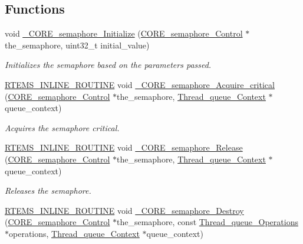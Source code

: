 \subsection*{Functions}
\begin{DoxyCompactItemize}
\item 
void \mbox{\hyperlink{group__RTEMSScoreSemaphore_gac27cc1e0e9ee28a645e9bdbd0f14fb1a}{\+\_\+\+C\+O\+R\+E\+\_\+semaphore\+\_\+\+Initialize}} (\mbox{\hyperlink{structCORE__semaphore__Control}{C\+O\+R\+E\+\_\+semaphore\+\_\+\+Control}} $\ast$the\+\_\+semaphore, uint32\+\_\+t initial\+\_\+value)
\begin{DoxyCompactList}\small\item\em Initializes the semaphore based on the parameters passed. \end{DoxyCompactList}\item 
\mbox{\hyperlink{group__RTEMSScoreBaseDefs_gac216239df231d5dbd15e3520b0b9313f}{R\+T\+E\+M\+S\+\_\+\+I\+N\+L\+I\+N\+E\+\_\+\+R\+O\+U\+T\+I\+NE}} void \mbox{\hyperlink{group__RTEMSScoreSemaphore_gaac9e977e243913aae8631eba19979bdf}{\+\_\+\+C\+O\+R\+E\+\_\+semaphore\+\_\+\+Acquire\+\_\+critical}} (\mbox{\hyperlink{structCORE__semaphore__Control}{C\+O\+R\+E\+\_\+semaphore\+\_\+\+Control}} $\ast$the\+\_\+semaphore, \mbox{\hyperlink{structThread__queue__Context}{Thread\+\_\+queue\+\_\+\+Context}} $\ast$queue\+\_\+context)
\begin{DoxyCompactList}\small\item\em Acquires the semaphore critical. \end{DoxyCompactList}\item 
\mbox{\hyperlink{group__RTEMSScoreBaseDefs_gac216239df231d5dbd15e3520b0b9313f}{R\+T\+E\+M\+S\+\_\+\+I\+N\+L\+I\+N\+E\+\_\+\+R\+O\+U\+T\+I\+NE}} void \mbox{\hyperlink{group__RTEMSScoreSemaphore_ga1006d856222570dda9c8155c7b5bcacd}{\+\_\+\+C\+O\+R\+E\+\_\+semaphore\+\_\+\+Release}} (\mbox{\hyperlink{structCORE__semaphore__Control}{C\+O\+R\+E\+\_\+semaphore\+\_\+\+Control}} $\ast$the\+\_\+semaphore, \mbox{\hyperlink{structThread__queue__Context}{Thread\+\_\+queue\+\_\+\+Context}} $\ast$queue\+\_\+context)
\begin{DoxyCompactList}\small\item\em Releases the semaphore. \end{DoxyCompactList}\item 
\mbox{\hyperlink{group__RTEMSScoreBaseDefs_gac216239df231d5dbd15e3520b0b9313f}{R\+T\+E\+M\+S\+\_\+\+I\+N\+L\+I\+N\+E\+\_\+\+R\+O\+U\+T\+I\+NE}} void \mbox{\hyperlink{group__RTEMSScoreSemaphore_ga8cb7a05fae43763cd179a2c1dcdb873c}{\+\_\+\+C\+O\+R\+E\+\_\+semaphore\+\_\+\+Destroy}} (\mbox{\hyperlink{structCORE__semaphore__Control}{C\+O\+R\+E\+\_\+semaphore\+\_\+\+Control}} $\ast$the\+\_\+semaphore, const \mbox{\hyperlink{structThread__queue__Operations}{Thread\+\_\+queue\+\_\+\+Operations}} $\ast$operations, \mbox{\hyperlink{structThread__queue__Context}{Thread\+\_\+queue\+\_\+\+Context}} $\ast$queue\+\_\+context)

\end{DoxyCompactItemize}
